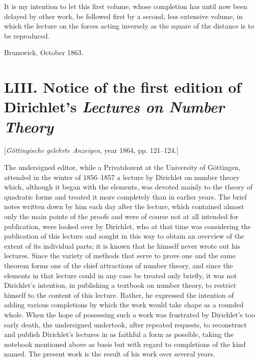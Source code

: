 \documentclass[11pt]{article}
\newcommand{\origpage}[1]{\par\vspace{0.25em}\noindent{\footnotesize\itshape [Printed page #1]}\par\vspace{0.25em}}
\begin{document}
\origpage{393}
It is my intention to let this first volume, whose completion has until now been delayed by other work, be followed first by a second, less extensive volume, in which the lecture on the forces acting inversely as the square of the distance is to be reproduced.

\begin{flushright}Brunswick, October 1863.\end{flushright}

\origpage{394}
\section*{LIII. Notice of the first edition of Dirichlet's \textit{Lectures on Number Theory}}
\begin{center}\small [\textit{Göttingische gelehrte Anzeigen}, year 1864, pp. 121--124.]\end{center}

The undersigned editor, while a Privatdozent at the University of Göttingen, attended in the winter of 1856--1857 a lecture by Dirichlet on number theory which, although it began with the elements, was devoted mainly to the theory of quadratic forms and treated it more completely than in earlier years. The brief notes written down by him each day after the lecture, which contained almost only the main points of the proofs and were of course not at all intended for publication, were looked over by Dirichlet, who at that time was considering the publication of this lecture and sought in this way to obtain an overview of the extent of its individual parts; it is known that he himself never wrote out his lectures. Since the variety of methods that serve to prove one and the same theorem forms one of the chief attractions of number theory, and since the elements in that lecture could in any case be treated only briefly, it was not Dirichlet's intention, in publishing a textbook on number theory, to restrict himself to the content of this lecture. Rather, he expressed the intention of adding various completions by which the work would take shape as a rounded whole. When the hope of possessing such a work was frustrated by Dirichlet's too early death, the undersigned undertook, after repeated requests, to reconstruct and publish Dirichlet's lectures in as faithful a form as possible, taking the notebook mentioned above as basis but with regard to completions of the kind named. The present work is the result of his work over several years.
\end{document}
